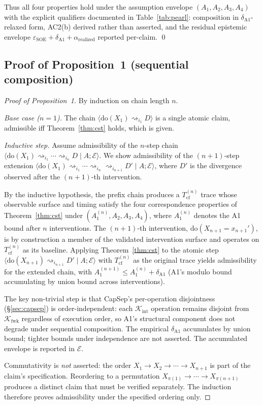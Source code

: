 \documentclass[conference]{IEEEtran}
\newcommand{\Tcf}{T_\text{cf}}
\newcommand{\Kint}{\mathcal{K}_\text{int}}
\newcommand{\Kfwk}{\mathcal{K}_\text{fwk}}
\newcommand{\arealized}{\alpha_\text{realized}}
\newcommand{\epsSOE}{\varepsilon_\text{SOE}}
\begin{document}
Thus all four properties hold under the assumption envelope
$(A_1, A_2, A_3, A_4)$ with the explicit qualifiers documented in
Table~\ref{tab:pearl}: composition in $\delta_{\text{A1}}$-relaxed
form, AC2(b) derived rather than asserted, and the residual
epistemic envelope $\epsSOE + \delta_{\text{A1}} + \arealized$
reported per-claim. \qed

\subsection{Proof of Proposition~1 (sequential composition)}

\begin{proof}[Proof of Proposition~1]
By induction on chain length $n$.

\emph{Base case ($n{=}1$).} The chain
$\langle \text{do}(X_1) \rightsquigarrow_{i_1} D \rangle$ is a
single atomic claim, admissible iff Theorem~\ref{thm:cst} holds,
which is given.

\emph{Inductive step.} Assume admissibility of the
$n$-step chain
$\langle \text{do}(X_1) \rightsquigarrow_{i_1} \cdots
\rightsquigarrow_{i_n} D \mid A; \mathcal{E}\rangle$. We show
admissibility of the $(n{+}1)$-step extension
$\langle \text{do}(X_1) \rightsquigarrow_{i_1} \cdots
\rightsquigarrow_{i_n} \rightsquigarrow_{i_{n+1}} D' \mid A;
\mathcal{E}\rangle$, where $D'$ is the divergence observed after
the $(n{+}1)$-th intervention.

By the inductive hypothesis, the prefix chain produces a
$\Tcf^{(n)}$ trace whose observable surface and timing satisfy
the four correspondence properties of Theorem~\ref{thm:cst} under
$(A_1^{(n)}, A_2, A_3, A_4)$, where $A_1^{(n)}$ denotes the A1
bound after $n$ interventions. The $(n{+}1)$-th intervention,
$\text{do}(X_{n+1} = x_{n+1}')$, is by construction a member of the
validated intervention surface and operates on
$\Tcf^{(n)}$ as its baseline. Applying Theorem~\ref{thm:cst} to
the atomic step $\langle \text{do}(X_{n+1}) \rightsquigarrow_{i_{n+1}}
D' \mid A; \mathcal{E}\rangle$ with $\Tcf^{(n)}$ as the original
trace yields admissibility for the extended chain, with
$A_1^{(n+1)} \leq A_1^{(n)} + \delta_{\text{A1}}$ (A1's modulo
bound accumulating by union bound across interventions).

The key non-trivial step is that CapSep's per-operation
disjointness (\S\ref{sec:capsep}) is order-independent: each
$\Kint$ operation remains disjoint from $\Kfwk$ regardless of
execution order, so A1's structural component does not degrade
under sequential composition. The empirical $\delta_{\text{A1}}$
accumulates by union bound; tighter bounds under independence
are not asserted. The accumulated envelope is reported in
$\mathcal{E}$.

Commutativity is \emph{not} asserted: the order
$X_1 \to X_2 \to \cdots \to X_{n+1}$ is part of the claim's
specification. Reordering to a permutation $X_{\pi(1)} \to \cdots
\to X_{\pi(n+1)}$ produces a distinct claim that must be verified
separately. The induction therefore proves admissibility under
the specified ordering only.
\end{proof}
\end{document}
